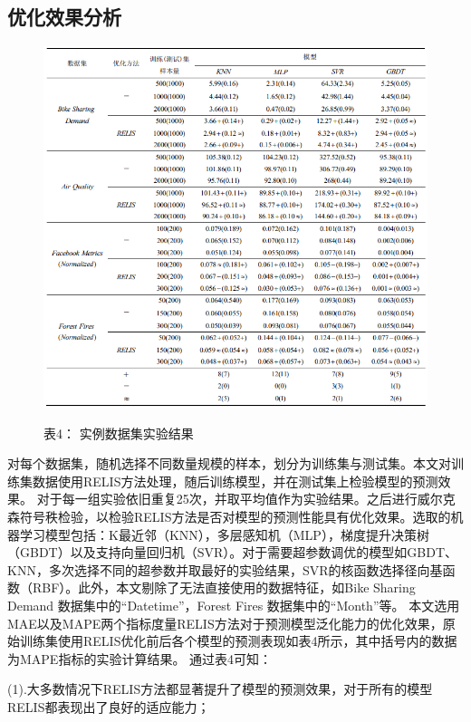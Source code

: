 \documentclass[12pt,a4paper]{article}%
\begin{document}
	\subsection{优化效果分析}
	\begin{figure}[t!]
		\centering
		\caption*{表4：  实例数据集实验结果}
		\includegraphics[width=1.0\textwidth]{模拟实验结果.png}
		\label{tab3}
	\end{figure}

	对每个数据集，随机选择不同数量规模的样本，划分为训练集与测试集。本文对训练集数据使用RELIS方法处理，随后训练模型，并在测试集上检验模型的预测效果。
	对于每一组实验依旧重复25次，并取平均值作为实验结果。之后进行威尔克森符号秩检验，以检验RELIS方法是否对模型的预测性能具有优化效果。选取的机器学习模型包括：K最近邻（KNN），多层感知机（MLP），梯度提升决策树（GBDT）以及支持向量回归机（SVR）。对于需要超参数调优的模型如GBDT、KNN，多次选择不同的超参数并取最好的实验结果，SVR的核函数选择径向基函数（RBF）。此外，本文剔除了无法直接使用的数据特征，如Bike Sharing Demand 数据集中的“Datetime”，Forest Fires 数据集中的“Month”等。
	本文选用MAE以及MAPE两个指标度量RELIS方法对于预测模型泛化能力的优化效果，原始训练集使用RELIS优化前后各个模型的预测表现如表4所示，其中括号内的数据为MAPE指标的实验计算结果。
	通过表4可知：
	

	(1).大多数情况下RELIS方法都显著提升了模型的预测效果，对于所有的模型RELIS都表现出了良好的适应能力；
\end{document}
